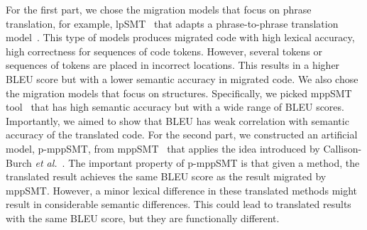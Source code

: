 For the first part, we chose the migration models that focus on phrase
translation, for example, lpSMT~\cite{fse13-nier} that adapts a
phrase-to-phrase translation model~\cite{phrasal10}. This type of
models produces migrated code with high lexical accuracy, \ie high
correctness for sequences of code tokens. However, several tokens or
sequences of tokens are placed in incorrect locations.  This results
in a higher BLEU score but with a lower semantic accuracy in migrated
code. We also chose the migration models that focus on
structures. Specifically, we picked mppSMT tool~\cite{ase15} that has
high semantic accuracy but with a wide range of BLEU
scores. Importantly, we aimed to show that BLEU has weak correlation
with semantic accuracy of the translated code. 
%
%
For the second part, we constructed an artificial model, p-mppSMT, from
mppSMT~\cite{ase15} that applies the idea introduced by Callison-Burch
{\em et al.}~\cite{Callison}. The important property of p-mppSMT is
that given a method, the translated result achieves the same BLEU
score as the result migrated by mppSMT. However, a minor lexical
difference in these translated methods might result in considerable
semantic differences. This could lead to translated results with the
same BLEU score, but they are functionally different.

%

